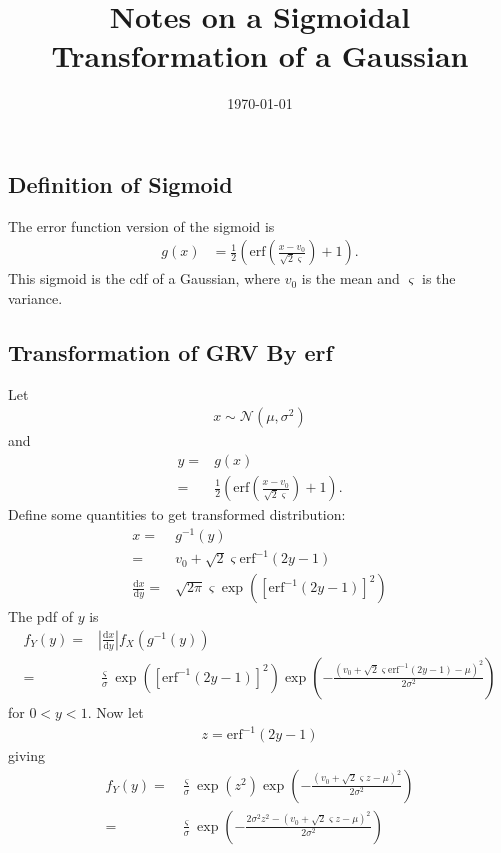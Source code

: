 \documentclass{article}
\title{Notes on a Sigmoidal Transformation of a Gaussian}
\date{\today}
\begin{document}
\maketitle



\subsection*{Definition of Sigmoid}
The error function version of the sigmoid is 
\begin{align}
	g(x) &= \frac{1}{2}\left(\mathrm{erf}\left(\frac{x-v_{0}}{\sqrt{2}\varsigma}\right) + 1\right).
\end{align}
This sigmoid is the cdf of a Gaussian, where $v_0$ is the mean and $\varsigma$ is the variance.

\subsection*{Transformation of GRV By erf}
Let
\begin{align}
	x\sim\mathcal{N}\left(\mu,\sigma^2\right)
\end{align}
and
\begin{align}
	y =& g(x) \\
	=& \frac{1}{2}\left(\mathrm{erf}\left(\frac{x-v_0}{\sqrt{2}\varsigma}\right) + 1\right).
\end{align}
Define some quantities to get transformed distribution:
\begin{align}
	x =& g^{-1}(y) \\
	  =& v_0 + \sqrt{2}\varsigma\mathrm{erf}^{-1}\left(2y-1\right) \\
	\frac{\mathrm{d}x}{\mathrm{d}y} =& \sqrt{2\pi}\varsigma\exp \left( \left[\mathrm{erf}^{-1}\left(2y-1\right)\right]^2\right)
\end{align}
The pdf of $y$ is
\begin{align}
	f_Y(y) =& \left|\frac{\mathrm{d}x}{\mathrm{d}y}\right|f_X(g^{-1}(y)) \\
	=& \frac{\varsigma}{\sigma}\exp\left(\left[\mathrm{erf}^{-1}\left(2y-1\right)\right]^2\right)\exp\left(-\frac{\left(v_0 + \sqrt{2}\varsigma\mathrm{erf}^{-1}\left(2y-1\right) - \mu\right)^2}{2\sigma^2}\right)
\end{align}
for $0<y<1$. Now let
\begin{align}
	z = \mathrm{erf}^{-1}\left(2y-1\right)
\end{align}
giving
\begin{align}
	f_Y(y)=& \frac{\varsigma}{\sigma}\exp\left(z^2\right)\exp\left(-\frac{\left(v_0 + \sqrt{2}\varsigma z - \mu\right)^2}{2\sigma^2}\right) \\
	=& \frac{\varsigma}{\sigma}\exp\left(-\frac{2\sigma^2 z^2 - \left(v_0 + \sqrt{2}\varsigma z - \mu\right)^2}{2\sigma^2}\right)
\end{align}
\end{document}
